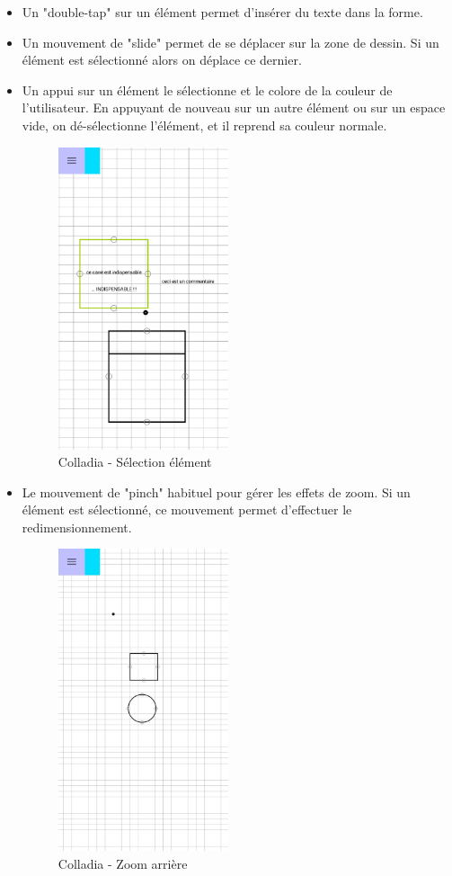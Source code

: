 \begin{itemize}
\item Un "double-tap" sur un élément permet d'insérer du texte dans la forme.

\item Un mouvement de "slide" permet de se déplacer sur la zone de dessin. Si un élément est sélectionné alors on déplace ce dernier.


\item Un appui sur un élément le sélectionne et le colore de la couleur de l'utilisateur. En appuyant de nouveau sur un autre élément ou sur un espace vide, on dé-sélectionne l'élément, et il reprend sa couleur normale.
		\begin{figure}[!h]
			\centering
			\includegraphics[width=5cm]{img/screen/colladia_draw_view_element_text}
			\caption{Colladia - Sélection élément}
		\end{figure}

\item Le mouvement de "pinch" habituel pour gérer les effets de zoom. Si un élément est sélectionné, ce mouvement permet d'effectuer le redimensionnement.
		\begin{figure}[!h]
			\centering
			\includegraphics[width=5cm]{img/screen/colladia_draw_view_zoom_out}
			\caption{Colladia - Zoom arrière}
		\end{figure}



\end{itemize}
